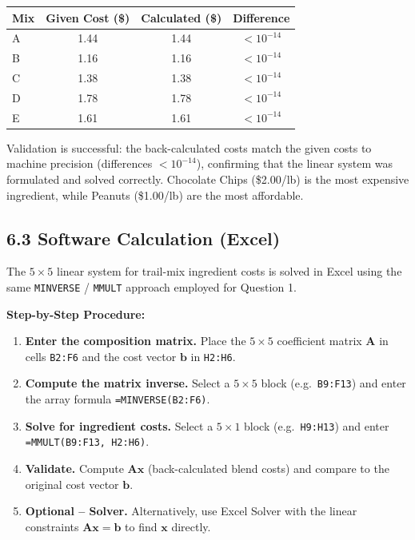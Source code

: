 \documentclass[12pt,a4paper]{article}
\begin{document}
\begin{center}
\begin{tabular}{lccc}
  \toprule
  \textbf{Mix} & \textbf{Given Cost (\$)} & \textbf{Calculated (\$)} & \textbf{Difference} \\
  \midrule
  A & 1.44 & 1.44 & $< 10^{-14}$ \\
  B & 1.16 & 1.16 & $< 10^{-14}$ \\
  C & 1.38 & 1.38 & $< 10^{-14}$ \\
  D & 1.78 & 1.78 & $< 10^{-14}$ \\
  E & 1.61 & 1.61 & $< 10^{-14}$ \\
  \bottomrule
\end{tabular}
\end{center}

Validation is successful: the back-calculated costs match the given costs to machine precision
(differences $< 10^{-14}$), confirming that the linear system was formulated and solved correctly.
Chocolate Chips (\$2.00/lb) is the most expensive ingredient, while Peanuts (\$1.00/lb)
are the most affordable.

\subsection{6.3 Software Calculation (Excel)}

The $5\times5$ linear system for trail-mix ingredient costs is solved in Excel using the same
\texttt{MINVERSE} / \texttt{MMULT} approach employed for Question 1.

\textbf{Step-by-Step Procedure:}
\begin{enumerate}
  \item \textbf{Enter the composition matrix.} Place the $5\times5$ coefficient matrix
        $\mathbf{A}$ in cells \texttt{B2:F6} and the cost vector $\mathbf{b}$ in
        \texttt{H2:H6}.
  \item \textbf{Compute the matrix inverse.} Select a $5\times5$ block (e.g.\ \texttt{B9:F13})
        and enter the array formula \texttt{=MINVERSE(B2:F6)}.
  \item \textbf{Solve for ingredient costs.} Select a $5\times1$ block (e.g.\ \texttt{H9:H13})
        and enter \texttt{=MMULT(B9:F13, H2:H6)}.
  \item \textbf{Validate.} Compute $\mathbf{A}\mathbf{x}$ (back-calculated blend costs)
        and compare to the original cost vector $\mathbf{b}$.
  \item \textbf{Optional -- Solver.} Alternatively, use Excel Solver with the linear
        constraints $\mathbf{A}\mathbf{x} = \mathbf{b}$ to find $\mathbf{x}$ directly.
\end{enumerate}
\end{document}

